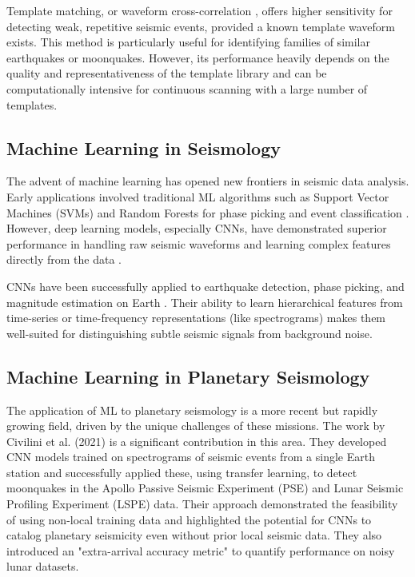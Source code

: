 \documentclass[conference]{IEEEtran}
\begin{document}
Template matching, or waveform cross-correlation \cite{b18}, offers higher sensitivity for detecting weak, repetitive seismic events, provided a known template waveform exists. This method is particularly useful for identifying families of similar earthquakes or moonquakes. However, its performance heavily depends on the quality and representativeness of the template library and can be computationally intensive for continuous scanning with a large number of templates.

\subsection{Machine Learning in Seismology}
The advent of machine learning has opened new frontiers in seismic data analysis. Early applications involved traditional ML algorithms such as Support Vector Machines (SVMs) and Random Forests for phase picking and event classification \cite{b19}. However, deep learning models, especially CNNs, have demonstrated superior performance in handling raw seismic waveforms and learning complex features directly from the data \cite{b16}.

CNNs have been successfully applied to earthquake detection, phase picking, and magnitude estimation on Earth \cite{b17, b20}. Their ability to learn hierarchical features from time-series or time-frequency representations (like spectrograms) makes them well-suited for distinguishing subtle seismic signals from background noise.

\subsection{Machine Learning in Planetary Seismology}
The application of ML to planetary seismology is a more recent but rapidly growing field, driven by the unique challenges of these missions. The work by Civilini et al. (2021) \cite{favPaper} is a significant contribution in this area. They developed CNN models trained on spectrograms of seismic events from a single Earth station and successfully applied these, using transfer learning, to detect moonquakes in the Apollo Passive Seismic Experiment (PSE) and Lunar Seismic Profiling Experiment (LSPE) data. Their approach demonstrated the feasibility of using non-local training data and highlighted the potential for CNNs to catalog planetary seismicity even without prior local seismic data. They also introduced an "extra-arrival accuracy metric" to quantify performance on noisy lunar datasets.
\end{document}
